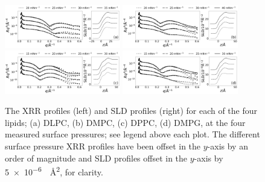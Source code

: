 \documentclass[amsmath,amssymb,twocolumn,superscriptaddress]{revtex4-1}
\begin{document}
\begin{figure}
    \centering
  \includegraphics[width=0.45\textwidth]{figures/dlpc_ref_sld}
    \includegraphics[width=0.45\textwidth]{figures/dmpc_ref_sld}
    \includegraphics[width=0.45\textwidth]{figures/dppc_ref_sld}
    \includegraphics[width=0.45\textwidth]{figures/dmpg_ref_sld}
    \caption{\small The XRR profiles (left) and SLD profiles (right) for each
  of the four lipids; (a) DLPC, (b) DMPC, (c) DPPC, (d) DMPG, at the four
  measured surface pressures; see legend above each plot. The different
  surface pressure XRR profiles have been offset in the $y$-axis by an order
  of magnitude and SLD profiles offset in the $y$-axis by
  \SI{5e-6}{\per\square\angstrom}, for clarity.}
    \label{fig:lipids}
\end{figure}
%
%
\end{document}
